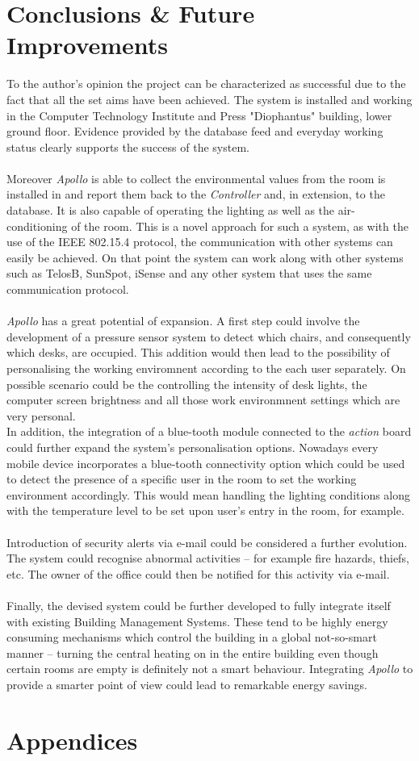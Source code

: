 \documentclass[12pt,a4paper,draft]{report}
\begin{document}
\chapter{Conclusions \& Future Improvements}
%
To the author's opinion the project can be characterized as successful due to the fact that all the set aims have been achieved.
The system is installed and working in the Computer Technology Institute and Press "Diophantus" building, lower ground floor.
Evidence provided by the database feed and everyday working status clearly supports the success of the system.\\
\ \\
Moreover \emph{Apollo} is able to collect the environmental values from the room is installed in and report them back to the \textit{Controller} and, in extension, to the database.
It is also capable of operating the lighting as well as the air-conditioning of the room.
This is a novel approach for such a system, as with the use of the IEEE 802.15.4 protocol, the communication with other systems can easily be achieved.
On that point the system can work along with other systems such as TelosB, SunSpot, iSense and any other system that uses the same communication protocol. \\
\ \\
\emph{Apollo} has a great potential of expansion.
A first step could involve the development of a pressure sensor system to detect which chairs, and consequently which desks, are occupied.
This addition would then lead to the possibility of personalising the working enviromnent according to the each user separately.
On possible scenario could be the controlling the intensity of desk lights, the computer screen brightness and all those work environmnent settings which are very personal.
\ \\
In addition, the integration of a blue-tooth module connected to the \textit{action} board could further expand the system's personalisation options.
Nowadays every mobile device incorporates a blue-tooth connectivity option which could be used to detect the presence of a specific user in the room to set the working environment accordingly.
This would mean handling the lighting conditions along with the temperature level to be set upon user's entry in the room, for example. \\
\ \\
Introduction of security alerts via e-mail could be considered a further evolution.
The system could recognise abnormal activities -- for example fire hazards, thiefs, etc.
The owner of the office could then be notified for this activity via e-mail.\\
\ \\
Finally, the devised system could be further developed to fully integrate itself with existing Building Management Systems.
These tend to be highly energy consuming mechanisms which control the building in a global not-so-smart manner -- turning the central heating on in the entire building even though certain rooms are empty is definitely not a smart behaviour.
Integrating \emph{Apollo} to provide a smarter point of view could lead to remarkable energy savings.
%
\newpage
%


%
\newpage
%
\chapter*{Appendices}
%
\end{document}
